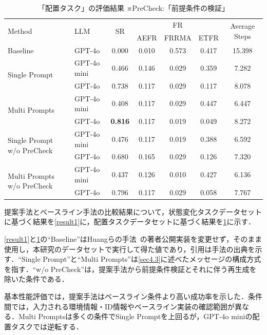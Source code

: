 \begin{table}[tb]
    \caption{「配置タスク」の評価結果  ※PreCheck:「前提条件の検証」}
    \label{result2}
    \centering
    \begin{tabular}{llccccc}
    \hline
         \multirow{2}{*}{Method} & \multirow{2}{*}{LLM} & \multirow{2}{*}{SR} & \multicolumn{3}{c}{FR} & \multirow{2}{*}{Average Steps}\\
          & & & AEFR & FRRMA & ETFR\\
    \hline
         Baseline~\cite{huang22} & GPT-4o & 0.000 & 0.010 & 0.573 & 0.417 & 15.398\\
    \hline    
         \multirow{2}{*}{Single Prompt} & GPT-4o mini & 0.466 & 0.146 & 0.029 & 0.359 & 7.282\\
         & GPT-4o & 0.738 & 0.117 & 0.029 & 0.117 & 8.078\\
         
         \multirow{2}{*}{Multi Prompts} & GPT-4o mini & 0.408 & 0.117 & 0.029 & 0.447 & 6.447\\
         & GPT-4o & \textbf{0.816} & 0.117 & 0.019 & 0.049 & 8.272\\
    \hline
        \multirow{2}{*}{Single Prompt w/o PreCheck} & GPT-4o mini & 0.476 & 0.117 & 0.019 & 0.388 & 6.592\\
         & GPT-4o & 0.680 & 0.165 & 0.029 & 0.126 & 7.320\\
         
         \multirow{2}{*}{Multi Prompts w/o PreCheck} & GPT-4o mini & 0.437 & 0.126 & 0.010 & 0.427 & 6.136\\
         & GPT-4o & 0.796 & 0.117 & 0.029 & 0.058 & 7.767\\
    \hline
    \end{tabular}
\end{table}

提案手法とベースライン手法の比較結果について，状態変化タスクデータセットに基づく結果を\ref{result1}に，配置タスクデータセットに基づく結果を\ref{result2}に示す．

\ref{result1}と\ref{result2}の``Baseline''はHuangらの手法~\cite{huang22}の著者公開実装を変更せず，そのまま使用し，本研究のデータセットで実行して得た値であり，引用は手法の出典を示す．``Single Prompt''と``Multi Prompts''は\ref{sec4.3}に述べたメッセージの構成方式を指す．``w/o PreCheck''は，提案手法から前提条件検証とそれに伴う再生成を除いた条件である．

基本性能評価では，提案手法はベースライン条件より高い成功率を示した．条件間では，入力される環境情報・ID情報やベースライン実装の確認範囲が異なる．Multi Promptsは多くの条件でSingle Promptを上回るが，GPT-4o miniの配置タスクでは逆転する．

